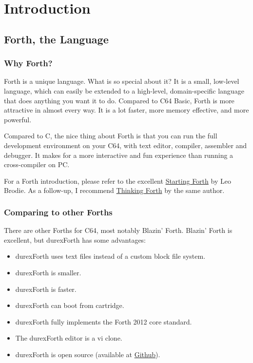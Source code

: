 \chapter{Introduction}

\section{Forth, the Language}

\subsection{Why Forth?}

Forth is a unique language. What is so special about it? It is a small, low-level language, which can easily be extended to a high-level, domain-specific language that does anything you want it to do. Compared to C64 Basic, Forth is more attractive in almost every way. It is a lot faster, more memory effective, and more powerful.

Compared to C, the nice thing about Forth is that you can run the full development environment on your C64,
with text editor, compiler, assembler and debugger. It makes for a more interactive and fun experience than running a cross-compiler on PC.

For a Forth introduction, please refer to the excellent
\href{http://www.forth.com/starting-forth/}{Starting Forth} by Leo Brodie. As a follow-up, I
recommend \href{http://thinking-forth.sourceforge.net/}{Thinking Forth} by the same author.

\subsection{Comparing to other Forths}

There are other Forths for C64, most notably Blazin' Forth. Blazin' Forth is excellent, but durexForth has some advantages:

\begin{itemize}
\item durexForth uses text files instead of a custom block file system.
\item durexForth is smaller.
\item durexForth is faster.
\item durexForth can boot from cartridge.
\item durexForth fully implements the Forth 2012 core standard.
\item The durexForth editor is a vi clone.
\item durexForth is open source (available at \href{https://github.com/jkotlinski/durexforth}{Github}).
\end{itemize}

